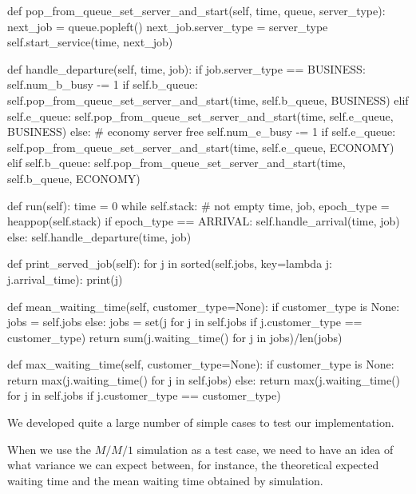 \begin{exercise}
\begin{solution}
\begin{pyverbatim}
    def pop_from_queue_set_server_and_start(self, time, queue, server_type):
        next_job = queue.popleft()
        next_job.server_type = server_type
        self.start_service(time, next_job)

    def handle_departure(self, time, job):
        if job.server_type == BUSINESS:
            self.num_b_busy -= 1
            if self.b_queue:
                self.pop_from_queue_set_server_and_start(time, self.b_queue, BUSINESS)
            elif self.e_queue:
                self.pop_from_queue_set_server_and_start(time, self.e_queue, BUSINESS)
        else:  # economy server free
            self.num_e_busy -= 1
            if self.e_queue:
                self.pop_from_queue_set_server_and_start(time, self.e_queue, ECONOMY)
            elif self.b_queue:  
                self.pop_from_queue_set_server_and_start(time, self.b_queue, ECONOMY)

    def run(self):
        time = 0
        while self.stack:  # not empty
            time, job, epoch_type = heappop(self.stack)
            if epoch_type == ARRIVAL:
                self.handle_arrival(time, job)
            else:
                self.handle_departure(time, job)

    def print_served_job(self):
        for j in sorted(self.jobs, key=lambda j: j.arrival_time):
            print(j)

    def mean_waiting_time(self, customer_type=None):
        if customer_type is None:
            jobs = self.jobs
        else:
            jobs = set(j for j in self.jobs if j.customer_type == customer_type)
        return sum(j.waiting_time() for j in jobs)/len(jobs)

    def max_waiting_time(self, customer_type=None):
        if customer_type is None:
            return max(j.waiting_time() for j in self.jobs)
        else:
            return max(j.waiting_time() for j in self.jobs if j.customer_type == customer_type)
              
\end{pyverbatim}
  \end{solution}
\end{exercise}



We developed quite a large number of simple cases to test our implementation. 



When we use the $M/M/1$ simulation as a test case, we need to have an idea of what  variance we can expect between, for instance, the theoretical expected waiting time and the mean waiting time obtained by simulation.



